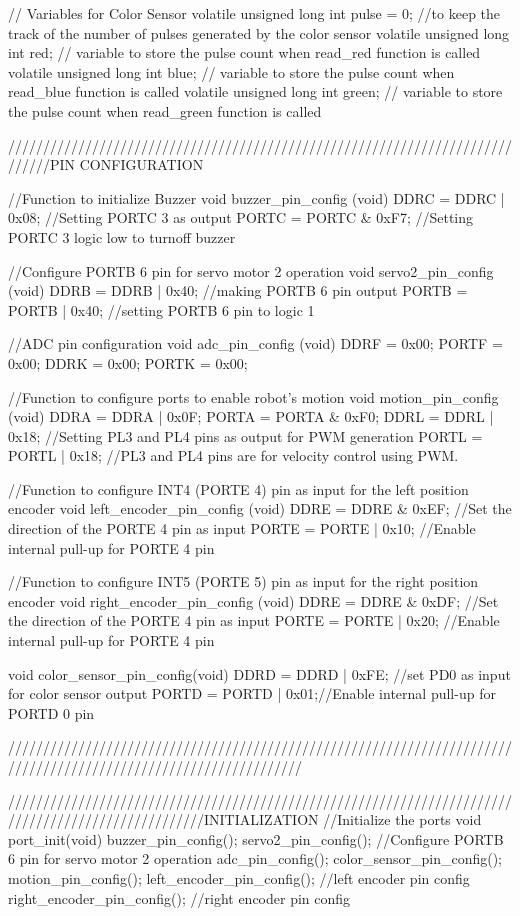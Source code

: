 // Variables for Color Sensor
volatile unsigned long int pulse = 0; //to keep the track of the number of pulses generated by the color sensor
volatile unsigned long int red;       // variable to store the pulse count when read_red function is called
volatile unsigned long int blue;      // variable to store the pulse count when read_blue function is called
volatile unsigned long int green;     // variable to store the pulse count when read_green function is called


//////////////////////////////////////////////////////////////////////////////PIN CONFIGURATION

//Function to initialize Buzzer
void buzzer_pin_config (void)
{
	DDRC = DDRC | 0x08;		//Setting PORTC 3 as output
	PORTC = PORTC & 0xF7;		//Setting PORTC 3 logic low to turnoff buzzer
}

//Configure PORTB 6 pin for servo motor 2 operation
void servo2_pin_config (void)
{
	DDRB  = DDRB | 0x40;  //making PORTB 6 pin output
	PORTB = PORTB | 0x40; //setting PORTB 6 pin to logic 1
}

//ADC pin configuration
void adc_pin_config (void)
{
	DDRF = 0x00;
	PORTF = 0x00;
	DDRK = 0x00;
	PORTK = 0x00;
}

//Function to configure ports to enable robot's motion
void motion_pin_config (void)
{
	DDRA = DDRA | 0x0F;
	PORTA = PORTA & 0xF0;
	DDRL = DDRL | 0x18;   //Setting PL3 and PL4 pins as output for PWM generation
	PORTL = PORTL | 0x18; //PL3 and PL4 pins are for velocity control using PWM.
}

//Function to configure INT4 (PORTE 4) pin as input for the left position encoder
void left_encoder_pin_config (void)
{
	DDRE  = DDRE & 0xEF;  //Set the direction of the PORTE 4 pin as input
	PORTE = PORTE | 0x10; //Enable internal pull-up for PORTE 4 pin
}

//Function to configure INT5 (PORTE 5) pin as input for the right position encoder
void right_encoder_pin_config (void)
{
	DDRE  = DDRE & 0xDF;  //Set the direction of the PORTE 4 pin as input
	PORTE = PORTE | 0x20; //Enable internal pull-up for PORTE 4 pin
}


void color_sensor_pin_config(void)
{
	DDRD  = DDRD | 0xFE; //set PD0 as input for color sensor output
	PORTD = PORTD | 0x01;//Enable internal pull-up for PORTD 0 pin
}

//////////////////////////////////////////////////////////////////////////////////////////////////////////////////

////////////////////////////////////////////////////////////////////////////////////////////////////INITIALIZATION
//Initialize the ports
void port_init(void)
{   buzzer_pin_config();
	servo2_pin_config();        //Configure PORTB 6 pin for servo motor 2 operation
	adc_pin_config();
	color_sensor_pin_config();
	motion_pin_config();
	left_encoder_pin_config(); //left encoder pin config
	right_encoder_pin_config(); //right encoder pin config
}

